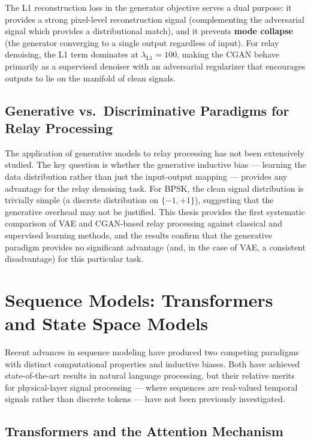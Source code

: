 \documentclass[
  english,
  12pt,
  12pt,
  a4paper,
  oneside]{report}
\begin{document}
The L1 reconstruction loss in the generator objective serves a dual purpose: it provides a strong pixel-level reconstruction signal (complementing the adversarial signal which provides a distributional match), and it prevents \textbf{mode collapse} (the generator converging to a single output regardless of input). For relay denoising, the L1 term dominates at \(\lambda_{\text{L1}} = 100\), making the CGAN behave primarily as a supervised denoiser with an adversarial regularizer that encourages outputs to lie on the manifold of clean signals.

\subsection{Generative vs.~Discriminative Paradigms for Relay Processing}\label{sec:generative-vs.-discriminative-paradigms-for-relay-processing}

The application of generative models to relay processing has not been extensively studied. The key question is whether the generative inductive bias --- learning the data distribution rather than just the input-output mapping --- provides any advantage for the relay denoising task. For BPSK, the clean signal distribution is trivially simple (a discrete distribution on \(\{-1, +1\}\)), suggesting that the generative overhead may not be justified. This thesis provides the first systematic comparison of VAE and CGAN-based relay processing against classical and supervised learning methods, and the results confirm that the generative paradigm provides no significant advantage (and, in the case of VAE, a consistent disadvantage) for this particular task.

\section{Sequence Models: Transformers and State Space Models}\label{sec:sequence-models-transformers-and-state-space-models}

Recent advances in sequence modeling have produced two competing paradigms with distinct computational properties and inductive biases. Both have achieved state-of-the-art results in natural language processing, but their relative merits for physical-layer signal processing --- where sequences are real-valued temporal signals rather than discrete tokens --- have not been previously investigated.

\subsection{Transformers and the Attention Mechanism}\label{sec:transformers-and-the-attention-mechanism}
\end{document}
